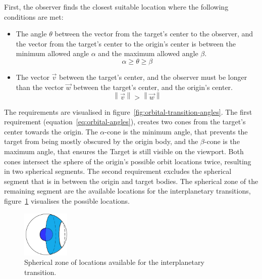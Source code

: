 First, the observer finds the closest suitable location where the following conditions are met:
\begin{itemize}
    \item The angle $\theta$ between the vector from the target's center to the observer, and the vector from the
    target's center to the origin's center is between the minimum allowed angle $\alpha$ and the maximum allowed
    angle $\beta$.
    \begin{equation}
        \label{eq:orbital-angles}
        \alpha \geq \theta \geq \beta
    \end{equation}

    \item The vector $\vec{v}$ between the target's center, and the observer must be longer than the vector $\vec{w}$
    between the target's center, and the origin's center.
    \begin{equation}
        \label{eq:orbital-magnitudes}
        \left\| \vec{v} \right\| > \left\| \vec{w} \right\|
    \end{equation}
\end{itemize}
The requirements are visualised in figure~\ref{fig:orbital-transition-angles}.
The first requirement (equation~\ref{eq:orbital-angles}), creates two cones from the target's center towards the origin.
The $\alpha$-cone is the minimum angle, that prevents the target from being mostly obscured by the origin body, and
the $\beta$-cone is the maximum angle, that ensures the Target is still visible on the viewport.
Both cones intersect the sphere of the origin's possible orbit locations twice, resulting in two spherical segments.
The second requirement excludes the spherical segment that is in between the origin and target bodies.
The spherical zone of the remaining segment are the available locations for the interplanetary transitions,
figure~\ref{fig:orbital-transition-zone} visualises the possible locations.

\begin{figure}
    \centering
    \includegraphics[width=0.2\textwidth]{content/4_3_autoNavigation/img/OrbitTransitionSphericalZone}
    \caption{Spherical zone of locations available for the interplanetary transition.}
    \label{fig:orbital-transition-zone}
\end{figure}


